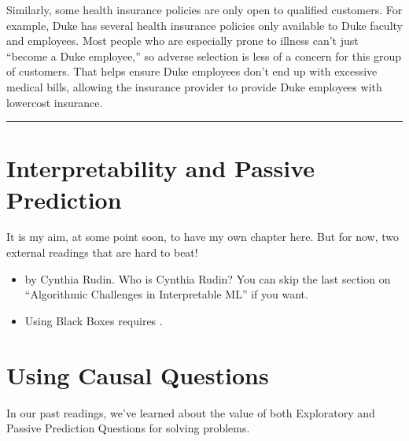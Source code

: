 \documentclass[letterpaper,10pt,english]{jupyterBook}
\begin{document}
\sphinxAtStartPar
Similarly, some health insurance policies are only open to qualified customers. For example, Duke has several health insurance policies only available to Duke faculty and employees. Most people who are especially prone to illness can’t just “become a Duke employee,” so adverse selection is less of a concern for this group of customers. That helps ensure Duke employees don’t end up with excessive medical bills, allowing the insurance provider to provide Duke employees with lower\sphinxhyphen{}cost insurance.


\bigskip\hrule\bigskip


\sphinxstepscope


\chapter{Interpretability and Passive Prediction}
\label{\detokenize{30_questions/32_passive_interpretable_models:interpretability-and-passive-prediction}}\label{\detokenize{30_questions/32_passive_interpretable_models::doc}}
\sphinxAtStartPar
It is my aim, at some point soon, to have my own chapter here. But for now, two external readings that are hard to beat!
\begin{itemize}
\item {} 
\sphinxAtStartPar
{} by Cynthia Rudin. Who is Cynthia Rudin?  You can skip the last section on “Algorithmic Challenges in Interpretable ML” if you want.

\item {} 
\sphinxAtStartPar
Using Black Boxes requires .

\end{itemize}



\sphinxstepscope


\chapter{Using Causal Questions}
\label{\detokenize{30_questions/35_using_causal_questions:using-causal-questions}}\label{\detokenize{30_questions/35_using_causal_questions::doc}}
\sphinxAtStartPar
In our past readings, we’ve learned about the value of both Exploratory and Passive Prediction Questions for solving problems.
\end{document}
